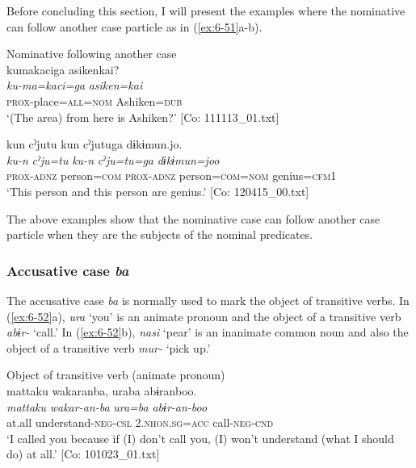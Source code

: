   Before concluding this section, I will present the examples where the nominative can follow another case particle as in (\ref{ex:6-51}a-b).

\ea\label{ex:6-51}
 Nominative following another case\\

 \ea {\TM}  kumakaciga  asikenkai?\\
\glll \textit{ku-ma=kaci=ga}  \textit{asiken=kai}\\
\textsc{prox}-place=\textsc{all}=\textsc{nom}  Ashiken=\textsc{dub}\\
\glt ‘(The area) from here is Ashiken?’ [Co: 111113\_01.txt]
\z

\ex {\TM}  kun  cˀjutu  kun  cˀjutuga  dɨkɨmun.jo.\\
\glll \textit{ku-n}  \textit{cˀju=tu}  \textit{ku-n}  \textit{cˀju=tu=ga} \textit{dɨkɨmun=joo}\\
\textsc{prox}-\textsc{adnz}  person=\textsc{com}  \textsc{prox}-\textsc{adnz}  person=\textsc{com}=\textsc{nom}   genius=\textsc{cfm}1\\

\glt ‘This person and this person are genius.’ [Co: 120415\_00.txt]
\z

The above examples show that the nominative case can follow another case particle when they are the subjects of the nominal predicates.

\subsubsection{Accusative case \textit{ba}}

The accusative case \textit{ba} is normally used to mark the object of transitive verbs. In (\ref{ex:6-52}a), \textit{ura} ‘you’ is an animate pronoun and the object of a transitive verb \textit{abɨr-} ‘call.’ In (\ref{ex:6-52}b), \textit{nasi} ‘pear’ is an inanimate common noun and also the object of a transitive verb \textit{mur-} ‘pick up.’

\ea\label{ex:6-52}
\ea Object of transitive verb (animate pronoun)\\
{\TM}
\glll  mattaku  wakaranba,  uraba  abɨranboo.\\
\textit{mattaku}  \textit{wakar-an-ba}  \textit{ura=ba}  \textit{abɨr-an-boo}\\
at.all  understand-\textsc{neg}-\textsc{csl}  2.\textsc{nhon}.\textsc{sg}=\textsc{acc}  call-\textsc{neg}-\textsc{cnd}\\
\glt ‘I called you because if (I) don’t call you, (I) won’t understand (what I should do) at all.’ [Co: 101023\_01.txt]
\z

